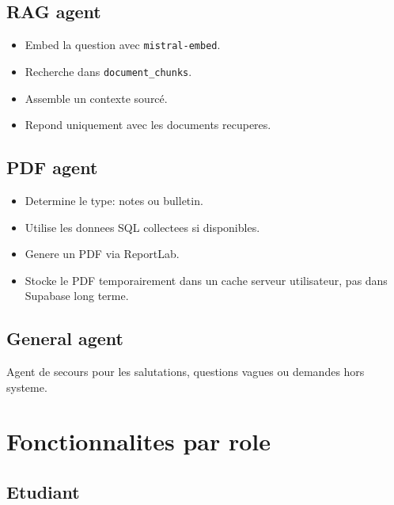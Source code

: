 \documentclass[11pt,a4paper]{article}
\begin{document}
\subsection{RAG agent}

\begin{itemize}[leftmargin=1.2cm]
  \item Embed la question avec \texttt{mistral-embed}.
  \item Recherche dans \texttt{document\_chunks}.
  \item Assemble un contexte sourcé.
  \item Repond uniquement avec les documents recuperes.
\end{itemize}

\subsection{PDF agent}

\begin{itemize}[leftmargin=1.2cm]
  \item Determine le type: notes ou bulletin.
  \item Utilise les donnees SQL collectees si disponibles.
  \item Genere un PDF via ReportLab.
  \item Stocke le PDF temporairement dans un cache serveur utilisateur, pas dans Supabase long terme.
\end{itemize}

\subsection{General agent}

Agent de secours pour les salutations, questions vagues ou demandes hors systeme.

\section{Fonctionnalites par role}

\subsection{Etudiant}
\end{document}
